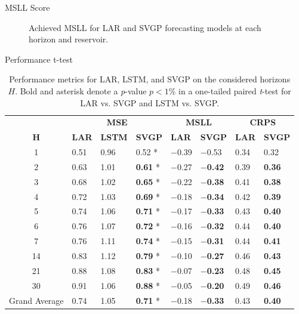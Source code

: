 \begin{frame}{MSLL Score}
	\begin{figure}[htbp]
		\setlength{} 
		\setlength{}
		\hspace{-1.5em}
		\caption{{Achieved MSLL} %
			for LAR and SVGP forecasting models at each horizon and reservoir.}
		\label{fig:msll_scores} 
	\end{figure}
\end{frame}

\begin{frame}{Performance t-test}
	\tiny
	\begin{table}[htbp]
		\caption{Performance metrics for LAR, LSTM, and SVGP on the considered horizons $H$. Bold and asterisk denote a \emph{p}-value $p<1\%$ in a one-tailed paired \emph{t}-test for LAR vs. SVGP and LSTM vs. SVGP.}
		\label{tab:metrics}
		\begin{tabular}{c p{1cm}p{1.0cm}p{1.0cm}p{1.0cm}p{1.0cm}p{1.0cm}p{1.0cm}}
			\toprule
			& \multicolumn{3}{c}{\textbf{MSE}} & \multicolumn{2}{c}{\textbf{MSLL}} & \multicolumn{2}{c}{\textbf{CRPS}} \\
			\cmidrule{2-8}
			\( \textbf{H} \) & \textbf{LAR} & \textbf{LSTM} & \textbf{SVGP} & \textbf{LAR} & \textbf{SVGP} & \textbf{LAR} & \textbf{SVGP} \\
			\midrule
			1  & 0.51 & 0.96 & 0.52 * & $-$0.39 & $-$0.53 & 0.34 & 0.32 \\
			2  & 0.63 & 1.01 & \textbf{0.61} * & $-$0.27 & \textbf{$-$0.42} & 0.39 & \textbf{0.36} \\
			3  & 0.68 & 1.02 & \textbf{0.65} * & $-$0.22 & \textbf{$-$0.38} & 0.41 & \textbf{0.38} \\
			4  & 0.72 & 1.03 & \textbf{0.69} * & $-$0.18 & \textbf{$-$0.34} & 0.42 & \textbf{0.39} \\
			5  & 0.74 & 1.06 & \textbf{0.71} * & $-$0.17 & \textbf{$-$0.33} & 0.43 & \textbf{0.40} \\
			6  & 0.76 & 1.07 & \textbf{0.72} * & $-$0.16 & \textbf{$-$0.32} & 0.44 & \textbf{0.40} \\
			7  & 0.76 & 1.11 & \textbf{0.74} * & $-$0.15 & \textbf{$-$0.31} & 0.44 & \textbf{0.41} \\
			14 & 0.83 & 1.12 & \textbf{0.79} * & $-$0.10 & \textbf{$-$0.27} & 0.46 & \textbf{0.43} \\
			21 & 0.88 & 1.08 & \textbf{0.83} * & $-$0.07 & \textbf{$-$0.23} & 0.48 & \textbf{0.45} \\
			30 & 0.91 & 1.06 & \textbf{0.88} * & $-$0.05 & \textbf{$-$0.20} & 0.49 & \textbf{0.46} \\
			\midrule
			Grand Average & 0.74 & 1.05 & \textbf{0.71} * & $-$0.18 & \textbf{$-$0.33} & 0.43 & \textbf{0.40} \\
			\bottomrule
		\end{tabular}
		

\end{table}
\end{frame}

